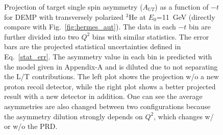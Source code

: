 \begin{figure}[!ht]
 \begin{center}
      \caption{\footnotesize{Projection of target single spin asymmetry
          ($A_{UT}$) as a function of $-t$ for DEMP with transversely polarized
          $\mathrm{^{3}He}$ at $E_{0}$=11~GeV (directly compare with
Fig.~\ref{fig:hermes_aut}).  The data in each $-t$ bin are further divided into
two $Q^{2}$ bins with similar statistics.  The error bars are the projected
statistical uncertainties defined in Eq.~\ref{stat_err}. The asymmetry value in
each bin is predicted with the model given in Appendix-A and is diluted due to
not separating the L/T contributions. The left plot shows the projection w/o a
new proton recoil detector, while the right plot shows a better projected
result with a new detector in addition. One can see the average asymmetries are
also changed between two configurations because the asymmetry dilution
strongly depends on $Q^{2}$, which changes w/ or w/o the PRD.}}
  \label{asym_t}
  \end{center}
\end{figure}


